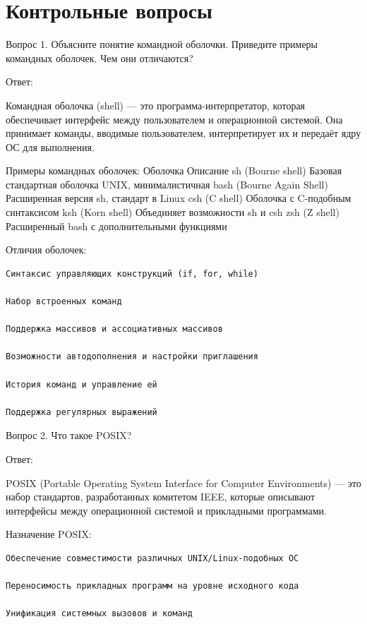 \documentclass[
  letterpaper,
  DIV=11,
  numbers=noendperiod]{scrartcl}
\begin{document}
\section{Контрольные
вопросы}\label{ux43aux43eux43dux442ux440ux43eux43bux44cux43dux44bux435-ux432ux43eux43fux440ux43eux441ux44b}

Вопрос 1. Объясните понятие командной оболочки. Приведите примеры
командных оболочек. Чем они отличаются?

Ответ:

Командная оболочка (shell) --- это программа-интерпретатор, которая
обеспечивает интерфейс между пользователем и операционной системой. Она
принимает команды, вводимые пользователем, интерпретирует их и передаёт
ядру ОС для выполнения.

Примеры командных оболочек: Оболочка Описание sh (Bourne shell) Базовая
стандартная оболочка UNIX, минималистичная bash (Bourne Again Shell)
Расширенная версия sh, стандарт в Linux csh (C shell) Оболочка с
C-подобным синтаксисом ksh (Korn shell) Объединяет возможности sh и csh
zsh (Z shell) Расширенный bash с дополнительными функциями

Отличия оболочек:

\begin{verbatim}
Синтаксис управляющих конструкций (if, for, while)

Набор встроенных команд

Поддержка массивов и ассоциативных массивов

Возможности автодополнения и настройки приглашения

История команд и управление ей

Поддержка регулярных выражений
\end{verbatim}

Вопрос 2. Что такое POSIX?

Ответ:

POSIX (Portable Operating System Interface for Computer Environments)
--- это набор стандартов, разработанных комитетом IEEE, которые
описывают интерфейсы между операционной системой и прикладными
программами.

Назначение POSIX:

\begin{verbatim}
Обеспечение совместимости различных UNIX/Linux-подобных ОС

Переносимость прикладных программ на уровне исходного кода

Унификация системных вызовов и команд
\end{verbatim}
\end{document}
